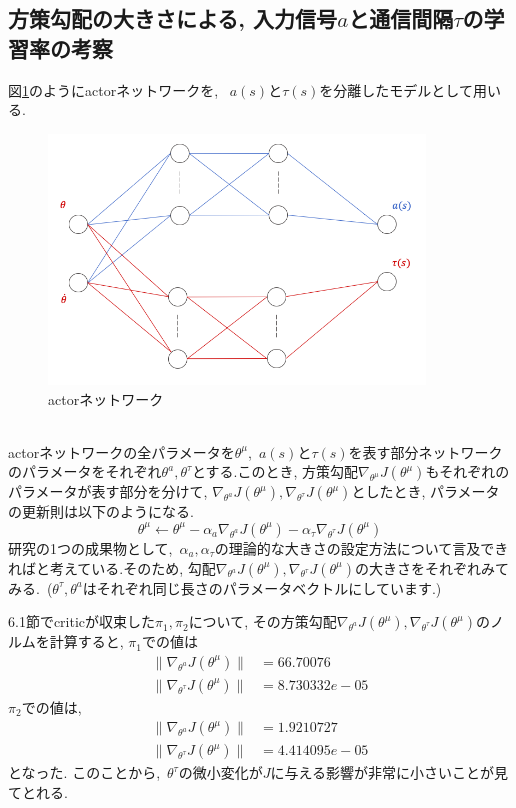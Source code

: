 \documentclass{jsarticle}
\begin{document}
{\subsection{方策勾配の大きさによる, 入力信号$a$と通信間隔$\tau$の学習率の考察}
図\ref{split_NN}のようにactorネットワークを, ~$a(s)$と$\tau(s)$を分離したモデルとして用いる. 
\begin{figure}[h]
	\centering
 	\includegraphics[width=10cm]{split_NN.png}
 	\caption{actorネットワーク} \label{split_NN}
\end{figure}\\
actorネットワークの全パラメータを$\theta^{\mu}$,~$a(s)$と$\tau(s)$を表す部分ネットワークのパラメータをそれぞれ$\theta^a, \theta^{\tau}$とする.このとき, 方策勾配$\nabla_{\theta^{\mu}}J(\theta^{\mu})$もそれぞれのパラメータが表す部分を分けて, $\nabla_{\theta^a}J(\theta^{\mu}), \nabla_{\theta^{\tau}}J(\theta^{\mu})$としたとき, パラメータの更新則は以下のようになる.
\begin{equation}
	\theta^{\mu}\gets \theta^{\mu} - \alpha_a\nabla_{\theta^a}J(\theta^{\mu}) - \alpha_{\tau}\nabla_{\theta^{\tau}}J(\theta^{\mu})
\end{equation}
研究の1つの成果物として,~$\alpha_a, \alpha_{\tau}$の理論的な大きさの設定方法について言及できればと考えている.そのため, 勾配$\nabla_{\theta^a}J(\theta^{\mu}), \nabla_{\theta^{\tau}}J(\theta^{\mu})$の大きさをそれぞれみてみる.~($\theta^{\tau}, \theta^{a}$はそれぞれ同じ長さのパラメータベクトルにしています.)\par
6.1節でcriticが収束した$\pi_1, \pi_2$について, その方策勾配$\nabla_{\theta^a}J(\theta^{\mu}), \nabla_{\theta^{\tau}}J(\theta^{\mu})$のノルムを計算すると, $\pi_1$での値は
\begin{align}
	\|\nabla_{\theta^a}J(\theta^{\mu})\| &= 66.70076 \\
	\|\nabla_{\theta^{\tau}}J(\theta^{\mu})\| &= 8.730332e-05
\end{align}
$\pi_2$での値は,
\begin{align}
	\|\nabla_{\theta^a}J(\theta^{\mu})\| &= 1.9210727 \\
	\|\nabla_{\theta^{\tau}}J(\theta^{\mu})\| &= 4.414095e-05
\end{align}
となった. このことから,~$\theta^{\tau}$の微小変化が$J$に与える影響が非常に小さいことが見てとれる. \par

}
\end{document}
